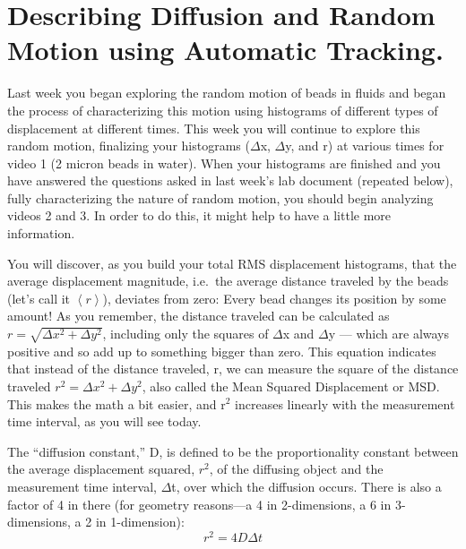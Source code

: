 \section{Describing Diffusion and Random Motion using Automatic Tracking.}
Last week you began exploring the random motion of beads in fluids and began the process of characterizing this motion using histograms of different types of displacement at different times. 
This week you will continue to explore this random motion, finalizing your histograms ($\Delta$x, $\Delta$y, and r) at various times for video 1 (2 micron beads in water). 
When your histograms are finished and you have answered the questions asked in last week's lab document (repeated below), fully characterizing the nature of random motion, you should begin analyzing videos 2 and 3. 
In order to do this, it might help to have a little more information. 
\par 
You will discover, as you build your total RMS displacement histograms, that the average displacement magnitude, i.e.\ the average distance traveled by the beads (let’s call it $\left< r \right>$), deviates from zero: Every bead changes its position by some amount! 
As you remember, the distance traveled can be calculated as $r = \sqrt{\Delta x^{2}+\Delta y^{2}}$, including only the squares of $\Delta$x and $\Delta$y — which are always positive and so add up to something bigger than zero. 
This equation indicates that instead of the distance traveled, r, we can measure the square of the distance traveled $r^{2} = \Delta x^{2} + \Delta y^{2}$, also called the Mean Squared Displacement or MSD. 
This makes the math a bit easier, and r$^{2}$ increases linearly with the measurement time interval, as you will see today. 
\par 
The ``diffusion constant,'' D, is defined to be the proportionality constant between the average displacement squared, $r^{2}$, of the diffusing object and the measurement time interval, $\Delta$t, over which the diffusion occurs. 
There is also a factor of 4 in there (for geometry reasons—a 4 in 2-dimensions, a 6 in 3-dimensions, a 2 in 1-dimension):
\begin{equation}
r^{2} = 4 D \Delta t
\end{equation} 
